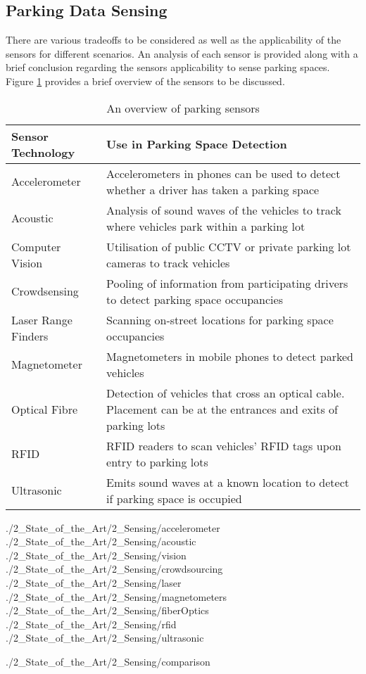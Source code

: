 \subsection{Parking Data Sensing}
There are various tradeoffs to be considered as well as the applicability of the sensors for different scenarios. An analysis of each sensor is provided along with a brief conclusion regarding the sensors applicability to sense parking spaces. Figure \ref{table:sensor_description} provides a brief overview of the sensors to be discussed.

\begin{table}[H]
    \begin{center}
        \begin{tabularx}{\textwidth}{l|p{10cm}}
            \textbf{Sensor Technology} & \textbf{Use in Parking Space Detection} \\
            \hline
            Accelerometer & Accelerometers in phones can be used to detect whether a driver has taken a parking space \\ \hline
            Acoustic & Analysis of sound waves of the vehicles to track where vehicles park within a parking lot \\ \hline
            Computer Vision & Utilisation of public CCTV or private parking lot cameras to track vehicles \\ \hline
            Crowdsensing & Pooling of information from participating drivers to detect parking space occupancies \\ \hline
            Laser Range Finders & Scanning on-street locations for parking space occupancies \\ \hline
            Magnetometer & Magnetometers in mobile phones to detect parked vehicles \\ \hline
            Optical Fibre & Detection of vehicles that cross an optical cable. Placement can be at the entrances and exits of parking lots \\ \hline
            \ac{RFID} & \ac{RFID} readers to scan vehicles' \ac{RFID} tags upon entry to parking lots \\ \hline
            Ultrasonic & Emits sound waves at a known location to detect if parking space is occupied \\ 
        \end{tabularx}
    \caption{An overview of parking sensors}
    \label{table:sensor_description}
    \end{center}
\end{table}

{./2_State_of_the_Art/2_Sensing/accelerometer}
{./2_State_of_the_Art/2_Sensing/acoustic}
{./2_State_of_the_Art/2_Sensing/vision}
{./2_State_of_the_Art/2_Sensing/crowdsourcing}
{./2_State_of_the_Art/2_Sensing/laser}
{./2_State_of_the_Art/2_Sensing/magnetometers}
{./2_State_of_the_Art/2_Sensing/fiberOptics}
{./2_State_of_the_Art/2_Sensing/rfid}
{./2_State_of_the_Art/2_Sensing/ultrasonic}

{./2_State_of_the_Art/2_Sensing/comparison}
